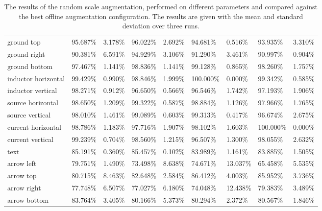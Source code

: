 \begin{table}[H]
\begin{center}
\begin{tabular}{|l|l|l|l|l|l|l|l|l|}
ground top                      & 95.687\% & 3.178\% & 96.022\% & 2.692\% & 94.681\%   & 0.516\%   & 93.935\%  & 3.310\%   \\
\rowcolor{lightgray!50}
ground right                    & 90.381\% & 6.591\% & 94.929\% & 3.106\% & 91.290\%   & 3.461\%   & 90.997\%  & 0.904\%   \\
ground bottom                   & 97.467\% & 1.141\% & 98.836\% & 1.141\% & 99.128\%   & 0.865\%   & 98.260\%  & 1.757\%   \\
\rowcolor{lightgray!50}
inductor horizontal             & 99.429\% & 0.990\% & 98.846\% & 1.999\% & 100.000\%  & 0.000\%   & 99.342\%  & 0.585\%   \\
inductor vertical               & 98.271\% & 0.912\% & 96.650\% & 0.566\% & 96.546\%   & 1.742\%   & 97.193\%  & 1.906\%   \\
\rowcolor{lightgray!50}
source horizontal               & 98.650\% & 1.209\% & 99.322\% & 0.587\% & 98.884\%   & 1.126\%   & 97.966\%  & 1.765\%   \\
source vertical                 & 98.010\% & 1.461\% & 99.089\% & 0.603\% & 99.313\%   & 0.417\%   & 96.674\%  & 2.675\%   \\
\rowcolor{lightgray!50}
current horizontal              & 98.786\% & 1.183\% & 97.716\% & 1.907\% & 98.102\%   & 1.603\%   & 100.000\% & 0.000\%   \\
current vertical                & 99.239\% & 0.704\% & 98.560\% & 1.215\% & 96.507\%   & 1.300\%   & 98.055\%  & 2.632\%   \\
\rowcolor{lightgray!50}
text                            & 85.191\% & 0.360\% & 85.457\% & 0.102\% & 83.989\%   & 1.161\%   & 83.885\%  & 1.505\%   \\
arrow left                      & 79.751\% & 1.490\% & 73.498\% & 8.638\% & 74.671\%   & 13.037\%  & 65.458\%  & 5.535\%   \\
\rowcolor{lightgray!50}
arrow top                       & 80.715\% & 8.463\% & 82.648\% & 2.584\% & 86.412\%   & 4.003\%   & 85.952\%  & 3.736\%   \\
arrow right                     & 77.748\% & 6.507\% & 77.027\% & 6.180\% & 74.048\%   & 12.438\%  & 79.383\%  & 3.489\%   \\
\rowcolor{lightgray!50}
arrow bottom                    & 83.764\% & 3.405\% & 80.166\% & 5.373\% & 80.294\%   & 2.372\%   & 80.567\%  & 1.846\%   \\
\hline

\end{tabular}
\caption{The results of the random scale augmentation, performed on different parameters and compared against the best offline augmentation configuration. The results are given with the mean and standard deviation over three runs.}
\label{tab:yolo_random_scale_augmentation_result}
\end{center}
\end{table}

